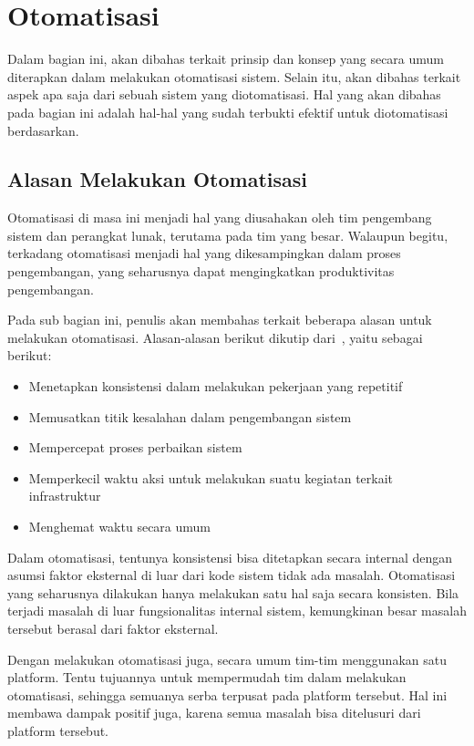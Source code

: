 \section{Otomatisasi}\label{automation}

Dalam bagian ini, akan dibahas terkait prinsip dan konsep yang secara umum diterapkan dalam melakukan otomatisasi sistem. Selain itu, akan dibahas terkait aspek apa saja dari sebuah sistem yang diotomatisasi. Hal yang akan dibahas pada bagian ini adalah hal-hal yang sudah terbukti efektif untuk diotomatisasi berdasarkan\cite{beyer2016site}.

\subsection{Alasan Melakukan Otomatisasi}
Otomatisasi di masa ini menjadi hal yang diusahakan oleh tim pengembang sistem dan perangkat lunak, terutama pada tim yang besar. Walaupun begitu, terkadang otomatisasi menjadi hal yang dikesampingkan dalam proses pengembangan, yang seharusnya dapat mengingkatkan produktivitas pengembangan.

Pada sub bagian ini, penulis akan membahas terkait beberapa alasan untuk melakukan otomatisasi. Alasan-alasan berikut dikutip dari~\cite{beyer2016site}, yaitu sebagai berikut:

\begin{itemize}
  \item Menetapkan konsistensi dalam melakukan pekerjaan yang repetitif
  \item Memusatkan titik kesalahan dalam pengembangan sistem
  \item Mempercepat proses perbaikan sistem
  \item Memperkecil waktu aksi untuk melakukan suatu kegiatan terkait infrastruktur
  \item Menghemat waktu secara umum
\end{itemize}

Dalam otomatisasi, tentunya konsistensi bisa ditetapkan secara internal dengan asumsi faktor eksternal di luar dari kode sistem tidak ada masalah. Otomatisasi yang seharusnya dilakukan hanya melakukan satu hal saja secara konsisten. Bila terjadi masalah di luar fungsionalitas internal sistem, kemungkinan besar masalah tersebut berasal dari faktor eksternal.

Dengan melakukan otomatisasi juga, secara umum tim-tim menggunakan satu platform. Tentu tujuannya untuk mempermudah tim dalam melakukan otomatisasi, sehingga semuanya serba terpusat pada platform tersebut. Hal ini membawa dampak positif juga, karena semua masalah bisa ditelusuri dari platform tersebut.

